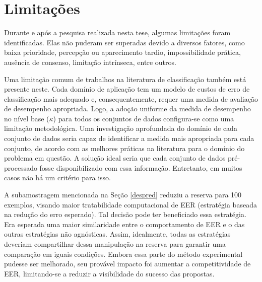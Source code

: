 \section{Limitações}\label{limitacoes}

Durante e após a pesquisa realizada nesta tese, algumas limitações foram identificadas.
Elas não puderam ser superadas devido a diversos fatores, como baixa prioridade, percepção ou aparecimento tardio, impossibilidade prática, ausência de consenso, limitação intrínseca, entre outros.

Uma limitação comum de trabalhos na literatura de classificação também está presente neste.
Cada domínio de aplicação tem um modelo de custos de erro de classificação mais adequado e, consequentemente, requer uma medida de avaliação de desempenho apropriada.
Logo, a adoção uniforme da medida de desempenho no nível base ($\kappa$) para todos os conjuntos de dados configura-se como uma limitação metodológica.
Uma investigação aprofundada do domínio de cada conjunto de dados seria capaz de identificar a medida mais apropriada para cada conjunto, de acordo com as melhores práticas na literatura para o domínio do problema em questão.
A solução ideal seria que cada conjunto de dados pré-processado fosse disponibilizado com essa informação. Entretanto, em muitos casos não há um critério para isso.

A subamostragem mencionada na Seção \ref{despred} reduziu a reserva para 100 exemplos, visando maior tratabilidade computacional de EER (estratégia baseada na redução do erro esperado).
Tal decisão pode ter beneficiado essa estratégia.
Era esperada uma maior similaridade entre o comportamento de EER e o das outras estratégias não agnósticas.
Assim, idealmente, todas as estratégias deveriam compartilhar dessa manipulação na reserva para garantir uma comparação em iguais condições.
Embora essa parte do método experimental pudesse ser melhorado, seu provável impacto foi aumentar a competitividade de EER, limitando-se a reduzir a visibilidade do sucesso das propostas.

